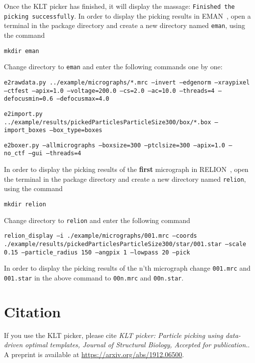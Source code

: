 \documentclass[12pt,a4paper]{article}
\begin{document}
Once the KLT picker has finished, it will display the massage: \texttt{Finished the picking successfully}. In order to display the picking results in EMAN~\cite{eman}, open a terminal in the package directory and create a new directory named \texttt{eman}, using the command
\begin{flushleft}
\texttt{mkdir eman}
\end{flushleft}
Change directory  to \texttt{eman} and enter the following commands one by one:
\begin{flushleft}
	\texttt{e2rawdata.py ../example/micrographs/*.mrc --invert --edgenorm --xraypixel --ctfest --apix=1.0 --voltage=200.0 --cs=2.0 --ac=10.0 --threads=4 --defocusmin=0.6 --defocusmax=4.0}
\end{flushleft}
\begin{flushleft}
	\texttt{e2import.py ../example/results/pickedParticlesParticleSize300/box/*.box --import\_boxes --box\_type=boxes}
\end{flushleft}
\begin{flushleft}
	\texttt{e2boxer.py --allmicrographs --boxsize=300 --ptclsize=300 --apix=1.0 --no\_ctf --gui --threads=4}
\end{flushleft}
 In order to display the picking results of the \textbf{first} micrograph in RELION~\cite{relion}, open the terminal in the package directory and create a new directory named \texttt{relion}, using the command
\begin{flushleft}
\texttt{mkdir relion}
\end{flushleft}
Change directory  to \texttt{relion} and enter the following command
 \begin{flushleft}
 	\texttt{relion\_display --i ./example/micrographs/001.mrc --coords ./example/results/pickedParticlesParticleSize300/star/001.star --scale 0.15 --particle\_radius 150 --angpix 1 --lowpass 20 --pick}
 \end{flushleft}
 In order to display the picking results of the n'th micrograph change   \texttt{001.mrc}  and \texttt{001.star} in the above command to \texttt{00n.mrc} and  \texttt{00n.star}.


\section{Citation}
If you use the KLT picker, please cite \emph{KLT picker: Particle picking using data-driven optimal templates, Journal of Structural Biology, Accepted for publication.}. A preprint is available at \url{https://arxiv.org/abs/1912.06500}.
\end{document}

